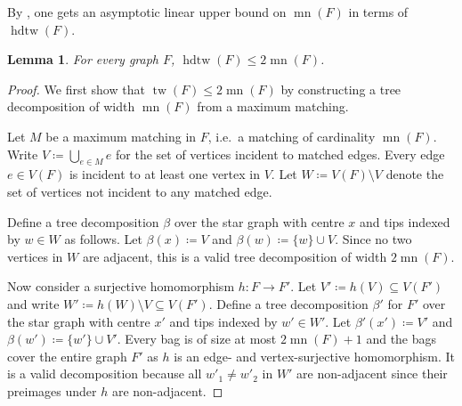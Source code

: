\documentclass[11pt, DIV=15]{scrarticle}
\theoremstyle{definition}
\theoremstyle{plain}
\newtheorem{lemma}[definition]{Lemma}
\theoremstyle{remark}
\DeclareMathOperator{\tw}{tw}
\DeclareMathOperator{\hdtw}{hdtw}
\DeclareMathOperator{\mn}{mn}
\begin{document}
	By \cite[220]{curticapean_homomorphisms_2017}, one gets an asymptotic linear upper bound on $\mn(F)$ in terms of $\hdtw(F)$.
	
	\begin{lemma}
		For every graph $F$,
		$\hdtw(F) \leq 2\mn(F)$.
	\end{lemma}
	\begin{proof}
		We first show that $\tw(F) \leq 2\mn(F)$ by constructing a tree decomposition of width $\mn(F)$ from a maximum matching.
		
		Let $M$ be a maximum matching in $F$, i.e.\ a matching of cardinality $\mn(F)$.
		Write $V \coloneqq \bigcup_{e \in M} e$ for the set of vertices incident to matched edges.
		Every edge $e \in V(F)$ is incident to at least one vertex in $V$.
		Let $W \coloneqq V(F) \setminus V$ denote the set of vertices not incident to any matched edge.
		
		Define a tree decomposition $\beta$ over the star graph with centre $x$ and tips indexed by $w \in W$ as follows.
		Let $\beta(x) \coloneqq V$ and $\beta(w) \coloneqq \{w\} \cup V$.
		Since no two vertices in $W$ are adjacent, this is a valid tree decomposition of width $2 \mn(F)$.
		
		Now consider a surjective homomorphism $h \colon F \to F'$.
		Let $V' \coloneqq h(V) \subseteq V(F')$ and write $W' \coloneqq h(W) \setminus V \subseteq V(F')$.
		Define a tree decomposition $\beta'$ for $F'$ over the star graph with centre $x'$ and tips indexed by $w' \in W'$.
		Let $\beta'(x') \coloneqq V'$ and $\beta(w') \coloneqq \{w'\} \cup V'$.
		Every bag is of size at most $2\mn(F) + 1$ and the bags cover the entire graph $F'$ as $h$ is an edge- and vertex-surjective homomorphism.
		It is a valid decomposition because all $w'_1 \neq w'_2$ in $W'$ are non-adjacent since their preimages under $h$ are non-adjacent.
	\end{proof}
	
	
\end{document}
